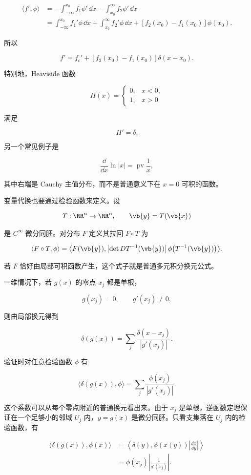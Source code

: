 \[
\begin{aligned}
\langle f',\phi\rangle
&=-\int_{-\infty}^{x_0}f_1\phi'\,\dd x
  -\int_{x_0}^{\infty}f_2\phi'\,\dd x\\
&=\int_{-\infty}^{x_0}f_1'\phi\,\dd x
  +\int_{x_0}^{\infty}f_2'\phi\,\dd x
  +[f_2(x_0)-f_1(x_0)]\phi(x_0).
\end{aligned}
\]

所以

\[
{
f'=f_c'+[f_2(x_0)-f_1(x_0)]\delta(x-x_0)
}.
\]

特别地，Heaviside 函数

\[
H(x)=
\begin{cases}0,&x<0,\\1,&x>0\end{cases}
\]

满足

\[
{H'=\delta}.
\]

另一个常见例子是

\[
{
\frac{\dd}{\dd x}\ln|x|
=\operatorname{pv}\frac1x
},
\]

其中右端是 Cauchy 主值分布，而不是普通意义下在 $x=0$ 可积的函数。

变量代换也要通过检验函数来定义。设

\[
T:\RR^n\to\RR^n,
\qquad \vb{y}=T(\vb{x})
\]

是 $C^\infty$ 微分同胚。对分布 $F$ 定义其拉回 $F\circ T$ 为

\[
{
\langle F\circ T,\phi\rangle
=
\left\langle
F(\vb{y}),
\left|\det DT^{-1}(\vb{y})\right|
\phi\!\left(T^{-1}(\vb{y})\right)
\right\rangle
}.
\]

若 $F$ 恰好由局部可积函数产生，这个式子就是普通多元积分换元公式。

一维情况下，若 $g(x)$ 的零点 $x_j$ 都是单根，

\[
g(x_j)=0,
\qquad g'(x_j)\neq0,
\]

则由局部换元得到

\[
{
\delta(g(x))
=\sum_j\frac{\delta(x-x_j)}{|g'(x_j)|}
}.
\]

验证时对任意检验函数 $\phi$ 有

\[
\langle\delta(g(x)),\phi\rangle
=\sum_j\frac{\phi(x_j)}{|g'(x_j)|}.
\]

这个系数可以从每个零点附近的普通换元看出来。由于 $x_j$ 是单根，逆函数定理保证在一个足够小的邻域 $U_j$ 内，$y=g(x)$ 是微分同胚。只看支集落在 $U_j$ 内的检验函数，有

\[
\begin{aligned}
\langle\delta(g(x)),\phi(x)\rangle
&=\left\langle\delta(y),
\phi(x(y))\left|\frac{\dd x}{\dd y}\right|\right\rangle\\
&=\phi(x_j)\left|\frac1{g'(x_j)}\right|.
\end{aligned}
\]

